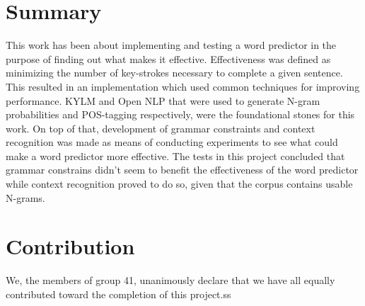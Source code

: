 \section{Summary}
This work has been about implementing and testing a word predictor in the purpose of finding out what makes it effective. Effectiveness was defined as minimizing the number of key-strokes necessary to complete a given sentence. This resulted in an implementation which used common techniques for improving performance. KYLM and Open NLP that were used to generate N-gram probabilities and POS-tagging respectively, were the foundational stones for this work. On top of that, development of grammar constraints and context recognition was made as means of conducting experiments to see what could make a word predictor more effective. The tests in this project concluded that grammar constrains didn’t seem to benefit the effectiveness of the word predictor while context recognition proved to do so, given that the corpus contains usable N-grams.  
\section{Contribution}
We, the members of group 41, unanimously declare that we have all equally contributed toward the completion of this project.ss